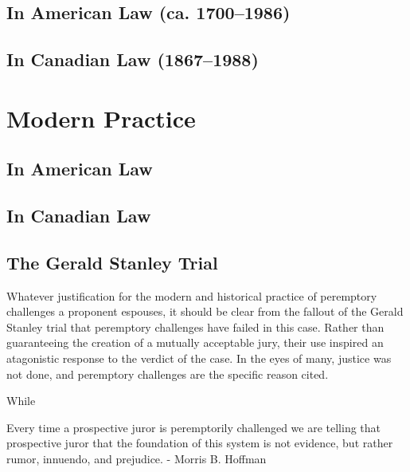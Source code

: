 \subsection{In American Law (ca. 1700--1986)}

\subsection{In Canadian Law (1867--1988)}

\section{Modern Practice} \label{sec:modprac}

\subsection{In American Law}

\subsection{In Canadian Law}

\subsection{The Gerald Stanley Trial}

Whatever justification for the modern and historical practice of peremptory challenges a proponent espouses, it should be clear
from the fallout of the Gerald Stanley trial that peremptory challenges have failed in this case. Rather than guaranteeing the
creation of a mutually acceptable jury, their use inspired an atagonistic response to the verdict of the case. In the eyes of
many, justice was not done, and peremptory challenges are the specific reason cited.

While

Every time a prospective juror is peremptorily challenged we are telling that prospective juror that the foundation of this system
is not evidence, but rather rumor, innuendo, and prejudice. - Morris B. Hoffman \cite{hoffman1997}

